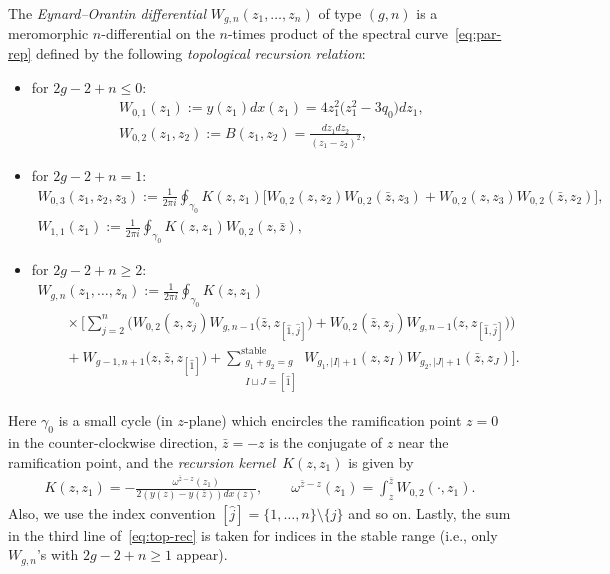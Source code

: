\begin{Def}
The {\em Eynard--Orantin differential}
$W_{g,n}(z_{1},\dots,z_{n})$ of type $(g,n)$
is a meromorphic $n$-dif\/ferential on the $n$-times product
of the spectral curve~\eqref{eq:par-rep} def\/ined by
the following {\em topological recursion relation}:
\begin{itemize}\itemsep=0pt
\item
for $2g-2+n \le 0$:
\begin{gather*}
W_{0,1}(z_{1})   :=   y(z_{1}) dx(z_{1})  = 4z_{1}^{2} \big(z_{1}^{2}-3q_{0}\big)dz_{1}  , \\
W_{0,2}(z_{1},z_{2})   :=   B(z_1, z_2)   = \frac{dz_{1}dz_{2}}{(z_{1}-z_{2})^{2}} ,
\end{gather*}
\item %
for $2g-2+n = 1$:
\begin{gather*}
W_{0,3}(z_{1},z_{2},z_{3})   :=   \frac{1}{2\pi i}
\oint_{\gamma_{0}} K(z,z_{1}) \big[ W_{0,2}(z,z_{2}) W_{0,2}(\bar{z},z_{3})
+ W_{0,2}(z,z_{3}) W_{0,2}(\bar{z},z_{2}) \big], \\
W_{1,1}(z_{1})   :=   \frac{1}{2\pi i}
\oint_{\gamma_{0}} K(z,z_{1}) W_{0,2}(z,\bar{z}),
\end{gather*}
\item %
for $2g-2+n \ge 2$:
\begin{gather}
W_{g,n}(z_{1},\dots,z_{n}) := \frac{1}{2\pi i}
\oint_{\gamma_{0}} K(z,z_{1})   \nonumber \\
 \qquad{}\times  \Biggl[ \sum_{j=2}^{n}
\big( W_{0,2}(z,z_{j}) W_{g,n-1}\big(\bar{z}, z_{[\hat{1},\hat{j}]}\big) +
W_{0,2}(\bar{z},z_{j}) W_{g,n-1}\big(z, z_{[\hat{1},\hat{j}]}\big) \big) \nonumber \\
\qquad{}+ W_{g-1,n+1}\big(z,\bar{z},z_{[\hat{1}]}\big) +
\sum_{\substack{g_{1}+g_{2}=g \\ I \sqcup J = [\hat{1}]}}^{\text{stable}}
W_{g_{1}, |I|+1}(z,z_{I}) W_{g_{2}, |J|+1}(\bar{z}, z_{J}) \Biggr].\label{eq:top-rec}
\end{gather}
\end{itemize}
Here $\gamma_{0}$ is a small cycle (in $z$-plane) which encircles
the ramif\/ication point $z=0$ in the counter-clockwise direction,
$\bar{z} = - z$ is the conjugate of $z$ near the ramif\/ication point,
and the {\em recursion kernel}~$K(z,z_{1})$ is given by
\begin{gather*} %
K(z,z_{1}) = - \frac{\omega^{\bar{z}-z}(z_{1})}{2(y(z) - y(\bar{z}))dx(z)}, \qquad
\omega^{\bar{z}-z}(z_{1}) = \int^{\bar{z}}_{z} W_{0,2}( \cdot, z_{1}).
\end{gather*}
Also, we use the index convention
$[\hat{j}] = \{1, \dots, n \}{\setminus}\{j\}$ and so on.
Lastly, the sum in the third line of~\eqref{eq:top-rec} is taken
for indices in the stable range
(i.e., only $W_{g,n}$'s with $2g - 2 + n \ge 1$ appear).
\end{Def}

